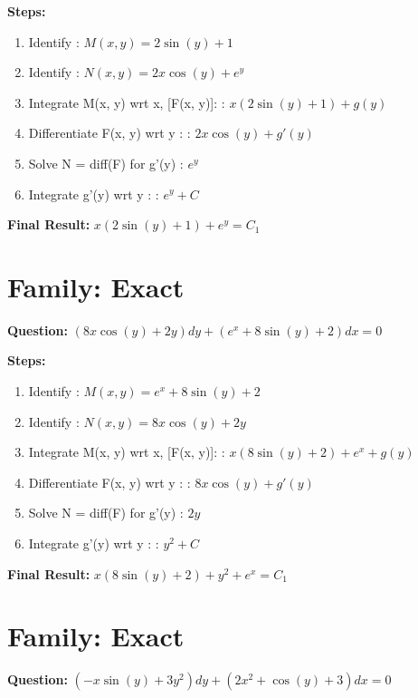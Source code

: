 \documentclass{article}
\begin{document}
\textbf{Steps:}
\begin{enumerate}
\item Identify :  $M(x, y) = 2 \sin{\left(y \right)} + 1$
\item Identify :  $N(x, y) = 2 x \cos{\left(y \right)} + e^{y}$
\item Integrate M(x, y) wrt x, [F(x, y)]: :  $x \left(2 \sin{\left(y \right)} + 1\right) + g(y)$
\item Differentiate F(x, y) wrt y :  :  $2 x \cos{\left(y \right)} + g'(y)$
\item Solve N = diff(F) for g'(y) :  $e^{y}$
\item Integrate g'(y) wrt y :  :  $e^{y} + C$
\end{enumerate}
\textbf{Final Result:} $x \left(2 \sin{\left(y \right)} + 1\right) + e^{y} = C_{1}$

\section*{Family: Exact}
\textbf{Question:} $\left(8 x \cos{\left(y \right)} + 2 y\right) dy + \left(e^{x} + 8 \sin{\left(y \right)} + 2\right) dx = 0$

\textbf{Steps:}
\begin{enumerate}
\item Identify :  $M(x, y) = e^{x} + 8 \sin{\left(y \right)} + 2$
\item Identify :  $N(x, y) = 8 x \cos{\left(y \right)} + 2 y$
\item Integrate M(x, y) wrt x, [F(x, y)]: :  $x \left(8 \sin{\left(y \right)} + 2\right) + e^{x} + g(y)$
\item Differentiate F(x, y) wrt y :  :  $8 x \cos{\left(y \right)} + g'(y)$
\item Solve N = diff(F) for g'(y) :  $2 y$
\item Integrate g'(y) wrt y :  :  $y^{2} + C$
\end{enumerate}
\textbf{Final Result:} $x \left(8 \sin{\left(y \right)} + 2\right) + y^{2} + e^{x} = C_{1}$

\section*{Family: Exact}
\textbf{Question:} $\left(- x \sin{\left(y \right)} + 3 y^{2}\right) dy + \left(2 x^{2} + \cos{\left(y \right)} + 3\right) dx = 0$
\end{document}
